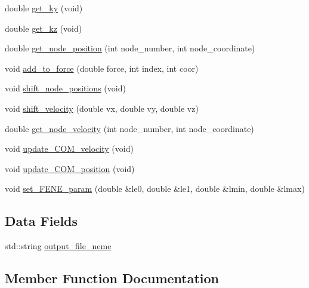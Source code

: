 \begin{DoxyCompactItemize}
\item 
double \mbox{\hyperlink{classECM_ae33002f6f6203246cce7ad05c160e051}{get\+\_\+ky}} (void)
\item 
double \mbox{\hyperlink{classECM_ad1cc47474c4e005570073d3be0504724}{get\+\_\+kz}} (void)
\item 
double \mbox{\hyperlink{classECM_a7c17fccf4d4f8165a7dceee20c81433d}{get\+\_\+node\+\_\+position}} (int node\+\_\+number, int node\+\_\+coordinate)
\item 
void \mbox{\hyperlink{classECM_a5ecaa9b089745b130c510aedbaea18e0}{add\+\_\+to\+\_\+force}} (double force, int index, int coor)
\item 
void \mbox{\hyperlink{classECM_a27b1c92c5a5d332698d7ae7cad1c36e4}{shift\+\_\+node\+\_\+positions}} (void)
\item 
void \mbox{\hyperlink{classECM_ae65e79751887e704a963f66e240057fe}{shift\+\_\+velocity}} (double vx, double vy, double vz)
\item 
double \mbox{\hyperlink{classECM_af327509a64d2220a505c16e9997e78c1}{get\+\_\+node\+\_\+velocity}} (int node\+\_\+number, int node\+\_\+coordinate)
\item 
void \mbox{\hyperlink{classECM_a7272481293ee528878aeb669343bcd4f}{update\+\_\+\+C\+O\+M\+\_\+velocity}} (void)
\item 
void \mbox{\hyperlink{classECM_a492d0690a480a0f0fdfcef3ef35bc970}{update\+\_\+\+C\+O\+M\+\_\+position}} (void)
\item 
void \mbox{\hyperlink{classECM_a434a26d9e696995b20642a5e87c2f0c2}{set\+\_\+\+F\+E\+N\+E\+\_\+param}} (double \&le0, double \&le1, double \&lmin, double \&lmax)
\end{DoxyCompactItemize}
\subsection*{Data Fields}
\begin{DoxyCompactItemize}
\item 
std\+::string \mbox{\hyperlink{classECM_a14bf2404f3c94c4e4e372c5eb9fd70cf}{output\+\_\+file\+\_\+neme}}
\end{DoxyCompactItemize}


\subsection{Member Function Documentation}
\mbox{\label{classECM_a5ecaa9b089745b130c510aedbaea18e0}} 
